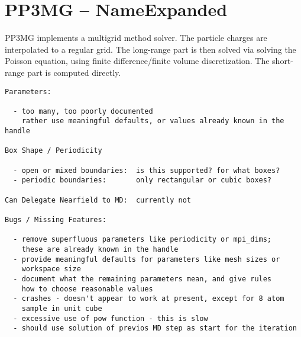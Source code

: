 \chapter{PP3MG -- NameExpanded}
\label{cha:pp3mg}


PP3MG implements a multigrid method solver. The particle charges are
interpolated to a regular grid. The long-range part is then solved via
solving the Poisson equation, using finite difference/finite volume
discretization. The short-range part is computed directly.

\begin{verbatim}
Parameters:

  - too many, too poorly documented
    rather use meaningful defaults, or values already known in the handle

Box Shape / Periodicity

  - open or mixed boundaries:  is this supported? for what boxes?
  - periodic boundaries:       only rectangular or cubic boxes?

Can Delegate Nearfield to MD:  currently not

Bugs / Missing Features:

  - remove superfluous parameters like periodicity or mpi_dims;
    these are already known in the handle
  - provide meaningful defaults for parameters like mesh sizes or
    workspace size
  - document what the remaining parameters mean, and give rules
    how to choose reasonable values
  - crashes - doesn't appear to work at present, except for 8 atom
    sample in unit cube
  - excessive use of pow function - this is slow
  - should use solution of previos MD step as start for the iteration

\end{verbatim}


